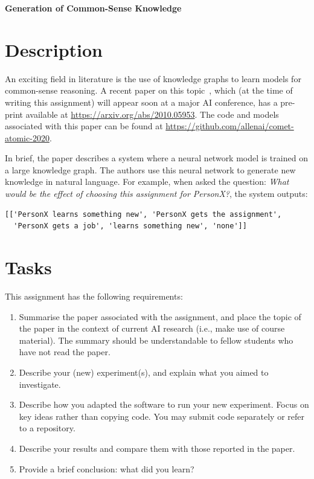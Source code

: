 \documentclass[11pt,a4paper]{article}
\begin{document}
{\huge \textbf{Generation of Common-Sense Knowledge}}

\section{Description}

An exciting field in literature is the use of knowledge graphs to learn models for common-sense reasoning. A recent paper on this topic~\cite{hwang2021atomic}, which (at the time of writing this assignment) will appear soon at a major AI conference, has a pre-print available at \url{https://arxiv.org/abs/2010.05953}. The code and models associated with this paper can be found at \url{https://github.com/allenai/comet-atomic-2020}.

In brief, the paper describes a system where a neural network model is trained on a large knowledge graph. The authors use this neural network to generate new knowledge in natural language. For example, when asked the question: \textit{What would be the effect of choosing this assignment for PersonX?}, the system outputs:

\begin{verbatim}
[['PersonX learns something new', 'PersonX gets the assignment',
  'PersonX gets a job', 'learns something new', 'none']]
\end{verbatim}

\section{Tasks}

This assignment has the following requirements:

\begin{enumerate}
	\item Summarise the paper associated with the assignment, and place the topic of the paper in the context of current AI research (i.e., make use of course material). The summary should be understandable to fellow students who have not read the paper.

	\item Describe your (new) experiment(s), and explain what you aimed to investigate.

	\item Describe how you adapted the software to run your new experiment. Focus on key ideas rather than copying code. You may submit code separately or refer to a repository.

	\item Describe your results and compare them with those reported in the paper.

	\item Provide a brief conclusion: what did you learn?
\end{enumerate}
\end{document}
